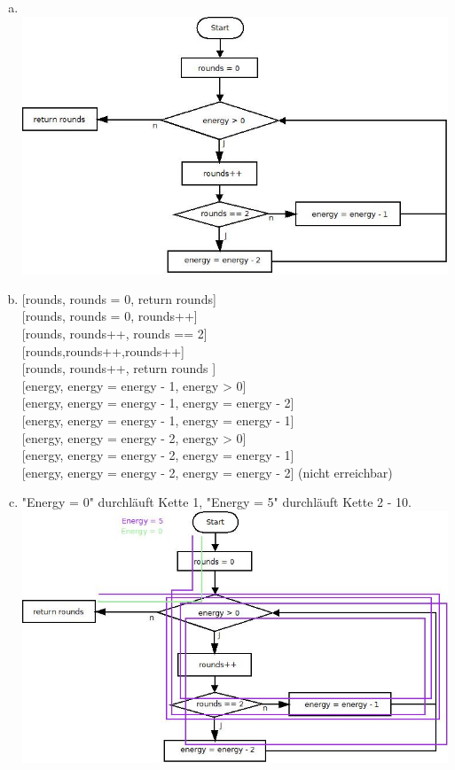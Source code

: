 \begin{enumerate} [a)]
	\item\phantom{}\\ \includegraphics[width=\textwidth, height=\textheight, keepaspectratio]{Aufgabe 20.jpeg}
	\item \phantom{} [rounds, rounds = 0, return rounds] \\
	\phantom{} [rounds, rounds = 0, rounds++] \\
		\phantom{}	[rounds, rounds++, rounds == 2] \\
		\phantom{} [rounds,rounds++,rounds++] \\
\phantom{}	[rounds, rounds++, return rounds ]\\
\phantom{}	[energy, energy = energy - 1, energy > 0] \\
\phantom{}	[energy, energy = energy - 1, energy = energy - 2] \\
\phantom{}	[energy, energy = energy - 1, energy = energy - 1] \\
\phantom{}	[energy, energy = energy - 2, energy > 0] \\
\phantom{}	[energy, energy = energy - 2, energy = energy - 1] \\
\phantom{}	[energy, energy = energy - 2, energy = energy - 2] (nicht erreichbar)\\
\pagebreak
\item  "\phantom{}Energy = 0"\phantom{} durchläuft Kette 1, "\phantom{}Energy = 5"\phantom{} durchläuft Kette 2 - 10.\\  \includegraphics[width=\textwidth, height=\textheight, keepaspectratio]{Aufgabe 20 DU.jpeg}
\end{enumerate}
